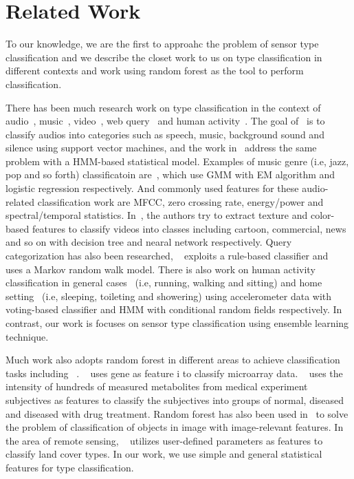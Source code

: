 \section{Related Work}
To our knowledge, we are the first to approahc the problem of sensor type classification and we describe the closet work to us on type classification in different contexts and work using random forest as the tool to perform classification. 

There has been much research work on type classification in the context of audio~\cite{audio1,audio2}, music~\cite{music1,music2}, video~\cite{video1,video2}, 
web query~\cite{query1,query2} and human activity~\cite{activity1, activity2}. The goal of~\cite{audio1} is to classify audios into categories such as speech, 
music, background sound and silence using support vector machines, and the work in~\cite{audio2} address the same problem with a HMM-based statistical model. 
Examples of music genre (i.e, jazz, pop and so forth) classificatoin are~\cite{music1,music2}, which use GMM with EM algorithm and logistic regression
respectively. And commonly used features for these audio-related classification work are MFCC, zero crossing rate, energy/power and spectral/temporal statistics. 
In~\cite{video1,video2}, the authors try to extract texture and color-based features to classify videos into classes including cartoon, commercial, news and so on 
with decision tree and nearal network respectively. Query categorization has also been researched, ~\cite{query1} exploits a rule-based classifier
and~\cite{query2} uses a Markov random walk model. There is also work on human activity classification in general cases~\cite{activity1} (i.e, running, walking 
and sitting) and home setting~\cite{activity2} (i.e, sleeping, toileting and showering) using accelerometer data with voting-based classifier and HMM with 
conditional random fields respectively. In contrast, our work is focuses on sensor type classification using ensemble learning technique.

Much work also adopts random forest in different areas to achieve classification tasks including ~\cite{RF1,RF2,RF3,RF4}. ~\cite{RF1} uses gene as feature i
to classify microarray data. ~\cite{RF2} uses the intensity of hundreds of measured metabolites from medical experiment subjectives as features to classify the 
subjectives into groups of normal, diseased and diseased with drug treatment. Random forest has also been used in~\cite{RF3} to solve the problem of classification 
of objects in image with image-relevant features. In the area of remote sensing, ~\cite{RF4} utilizes user-defined parameters as features to classify land cover 
types. In our work, we use simple and general statistical features for type classification.

